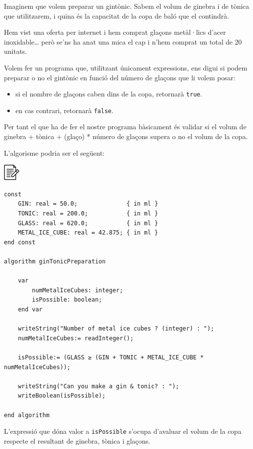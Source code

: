 \documentclass[]{book}
\providecommand{\tightlist}{%
  \setlength{\itemsep}{0pt}\setlength{\parskip}{0pt}}
\begin{document}
Imaginem que volem preparar un gintònic. Sabem el volum de ginebra i de
tònica que utilitzarem, i quina és la capacitat de la copa de baló que
el contindrà.

Hem vist una oferta per internet i hem comprat glaçons metàl·lics d'acer
inoxidable\ldots{} però se'ns ha anat una mica el cap i n'hem comprat un
total de 20 unitats.

Volem fer un programa que, utilitzant únicament expressions, ens digui
si podem preparar o no el gintònic en funció del número de glaçons que
li volem posar:

\begin{itemize}
\tightlist
\item
  si el nombre de glaçons caben dins de la copa, retornarà
  \texttt{true}.
\item
  en cas contrari, retornarà \texttt{false}.
\end{itemize}

Per tant el que ha de fer el nostre programa bàsicament és validar si el
volum de ginebra + tònica + (glaço) * número de glaçons supera o no el
volum de la copa.

L'algorisme podria ser el següent:

\includegraphics{./img/alg.png}

\begin{verbatim}
const
    GIN: real = 50.0;              { in ml }
    TONIC: real = 200.0;           { in ml }
    GLASS: real = 620.0;           { in ml }
    METAL_ICE_CUBE: real = 42.875; { in ml }
end const

algorithm ginTonicPreparation

    var
        numMetalIceCubes: integer;
        isPossible: boolean;
    end var

    writeString("Number of metal ice cubes ? (integer) : ");
    numMetalIceCubes:= readInteger();

    isPossible:= (GLASS ≥ (GIN + TONIC + METAL_ICE_CUBE * numMetalIceCubes));

    writeString("Can you make a gin & tonic? : ");
    writeBoolean(isPossible);

end algorithm
\end{verbatim}

L'expressió que dóna valor a \texttt{isPossible} s'ocupa d'avaluar el
volum de la copa respecte el resultant de ginebra, tònica i glaçons.
\end{document}
